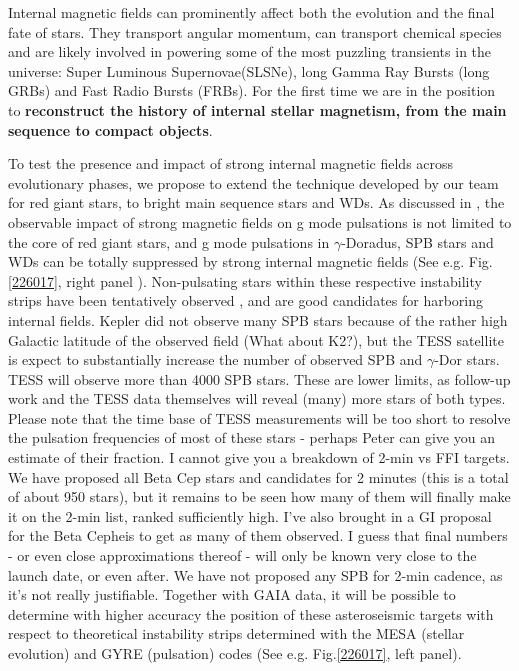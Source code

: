 Internal magnetic fields can prominently affect both the evolution and the final fate of stars. They transport angular momentum, can transport chemical species
and are likely involved in powering some of the most puzzling transients in the universe: Super Luminous Supernovae(SLSNe), long Gamma Ray Bursts (long GRBs) and Fast Radio Bursts (FRBs).
For the first time we are in the position to \textbf{reconstruct the history of internal stellar magnetism, from the main sequence to compact objects}.

To test the presence and impact of strong internal magnetic fields across evolutionary phases,
we propose to extend the technique developed by our team for red giant stars, to bright main sequence stars and WDs.
As discussed in \citet{Cantiello_2016}, the observable impact of strong magnetic fields on g mode pulsations is not limited to the core of red giant stars, and
 g mode pulsations in $\gamma$-Doradus, SPB stars and WDs can be totally suppressed by strong internal magnetic fields (See e.g. Fig.\ref{226017}, right panel ).
Non-pulsating stars within these respective instability strips have been tentatively observed \citep{Balona_2011}, and are good candidates for harboring internal fields.
Kepler did not observe many SPB stars because of the rather high Galactic latitude of the observed field (What about K2?), but the TESS satellite is expect to substantially increase the number of observed SPB and $\gamma$-Dor stars.  TESS will observe more than 4000 SPB stars. These are lower limits, as follow-up work and the TESS data themselves will reveal (many) more stars of both types. Please note that the time base of TESS measurements will be too short to resolve the pulsation frequencies of most of these stars - perhaps Peter can give you an estimate of their fraction. I cannot give you a breakdown of 2-min vs FFI targets. We have proposed all Beta Cep stars and candidates for 2 minutes (this is a total of about 950 stars), but it remains to be seen how many of them will finally make it on the 2-min list, ranked sufficiently high. I've also brought in a GI proposal for the Beta Cepheis to get as many of them observed. I guess that final numbers - or even close approximations thereof - will only be known very close to the launch date, or even after. We have not proposed any SPB for 2-min cadence, as it's not really justifiable.
Together with GAIA data, it will be possible to determine with higher accuracy the position of these asteroseismic targets with respect to
theoretical instability strips determined with the MESA (stellar evolution) and GYRE (pulsation) codes (See e.g. Fig.\ref{226017}, left panel).
